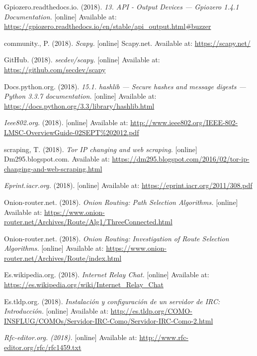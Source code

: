 \documentclass{article}
\begin{document}
\begin{thebibliography}{9}
  Gpiozero.readthedocs.io. (2018). \emph{13. API - Output Devices — Gpiozero 1.4.1 Documentation.}
  [online] Available at: \url{https://gpiozero.readthedocs.io/en/stable/api\_output.html\#buzzer}
  
  community., P. (2018). \emph{Scapy.}
  [online] Scapy.net. Available at: \url{https://scapy.net/}
  
   GitHub. (2018). \emph{secdev/scapy.}
  [online] Available at: \url{https://github.com/secdev/scapy}

   Docs.python.org. (2018). \emph{15.1. hashlib — Secure hashes and message digests — Python 3.3.7 documentation.}
  [online] Available at: \url{https://docs.python.org/3.3/library/hashlib.html}

   \emph{Ieee802.org.} (2018).
  [online] Available at: \url{http://www.ieee802.org/IEEE-802-LMSC-OverviewGuide-02SEPT%202012.pdf}

   scraping, T. (2018). \emph{Tor IP changing and web scraping.}
  [online] Dm295.blogspot.com. Available at: \url{https://dm295.blogspot.com/2016/02/tor-ip-changing-and-web-scraping.html}

   \emph{Eprint.iacr.org.} (2018).
  [online] Available at: \url{https://eprint.iacr.org/2011/308.pdf}

   Onion-router.net. (2018). \emph{Onion Routing: Path Selection Algorithms.}
  [online] Available at: \url{https://www.onion-router.net/Archives/Route/Alg1/ThreeConnected.html}

   Onion-router.net. (2018). \emph{Onion Routing: Investigation of Route Selection Algorithms.}
  [online] Available at: \url{https://www.onion-router.net/Archives/Route/index.html}

   Es.wikipedia.org. (2018). \emph{Internet Relay Chat.}
  [online] Available at: \url{https://es.wikipedia.org/wiki/Internet_Relay_Chat}

   Es.tldp.org. (2018). \emph{Instalación y configuración de un servidor de IRC: Introducción.}
  [online] Available at: \url{http://es.tldp.org/COMO-INSFLUG/COMOs/Servidor-IRC-Como/Servidor-IRC-Como-2.html}

   \emph{Rfc-editor.org. (2018).}
  [online] Available at: \url{http://www.rfc-editor.org/rfc/rfc1459.txt}
\end{thebibliography}
\end{document}
